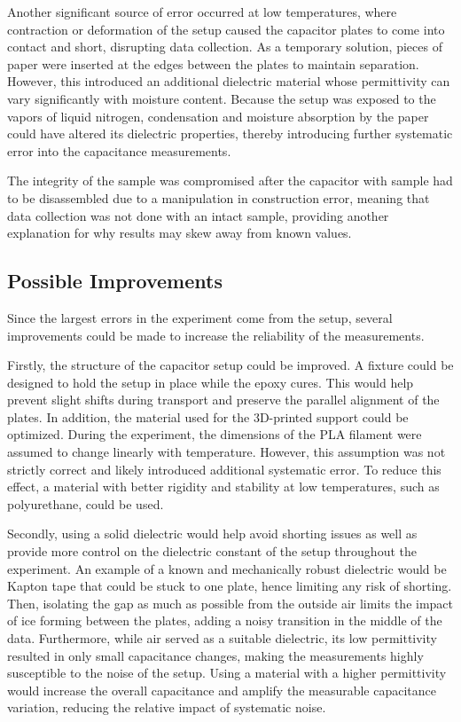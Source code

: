 \documentclass[letterpaper,12pt]{article}
\begin{document}
Another significant source of error occurred at low temperatures, where contraction or deformation of the setup caused the capacitor plates to come into contact and short, disrupting data collection. As a temporary solution, pieces of paper were inserted at the edges between the plates to maintain separation. However, this introduced an additional dielectric material whose permittivity can vary significantly with moisture content. Because the setup was exposed to the vapors of liquid nitrogen, condensation and moisture absorption by the paper could have altered its dielectric properties, thereby introducing further systematic error into the capacitance measurements.

The integrity of the sample was compromised after the capacitor with sample had to be disassembled due to a manipulation in construction error, meaning that data collection was not done with an intact sample, providing another explanation for why results may skew away from known values.

\subsection{Possible Improvements}

Since the largest errors in the experiment come from the setup, several improvements could be made to increase the reliability of the measurements.

Firstly, the structure of the capacitor setup could be improved. A fixture could be designed to hold the setup in place while the epoxy cures. This would help prevent slight shifts during transport and preserve the parallel alignment of the plates. In addition, the material used for the 3D-printed support could be optimized. During the experiment, the dimensions of the PLA filament were assumed to change linearly with temperature. However, this assumption was not strictly correct and likely introduced additional systematic error. To reduce this effect, a material with better rigidity and stability at low temperatures, such as polyurethane, could be used.

Secondly, using a solid dielectric would help avoid shorting issues as well as provide more control on the dielectric constant of the setup throughout the experiment. An example of a known and mechanically robust dielectric would be Kapton tape that could be stuck to one plate, hence limiting any risk of shorting. Then, isolating the gap as much as possible from the outside air limits the impact of ice forming between the plates, adding a noisy transition in the middle of the data. Furthermore, while air served as a suitable dielectric, its low permittivity resulted in only small capacitance changes, making the measurements highly susceptible to the noise of the setup. Using a material with a higher permittivity would increase the overall capacitance and amplify the measurable capacitance variation, reducing the relative impact of systematic noise.
\end{document}

